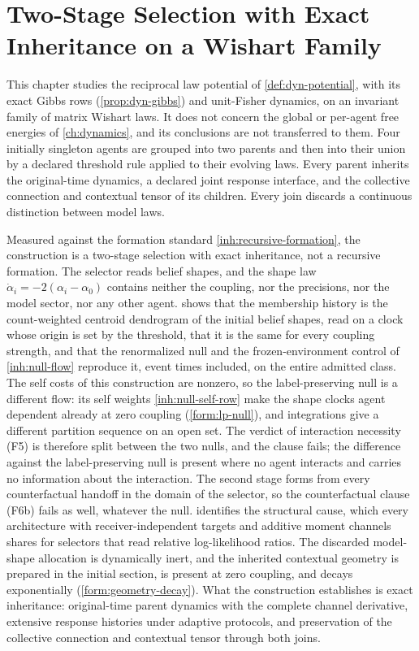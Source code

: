 \chapter{Two-Stage Selection with Exact Inheritance on a Wishart Family}
\label{ch:conditional-formation}

This chapter studies the reciprocal law potential of \cref{def:dyn-potential}, with its exact Gibbs rows (\cref{prop:dyn-gibbs}) and unit-Fisher dynamics, on an invariant family of matrix Wishart laws. It does not concern the global or per-agent free energies of \cref{ch:dynamics}, and its conclusions are not transferred to them. Four initially singleton agents are grouped into two parents and then into their union by a declared threshold rule applied to their evolving laws. Every parent inherits the original-time dynamics, a declared joint response interface, and the collective connection and contextual tensor of its children. Every join discards a continuous distinction between model laws.

Measured against the formation standard \cref{inh:recursive-formation}, the construction is a two-stage selection with exact inheritance, not a recursive formation. The selector reads belief shapes, and the shape law $\dot\alpha_i=-2(\alpha_i-\alpha_0)$ contains neither the coupling, nor the precisions, nor the model sector, nor any other agent.  shows that the membership history is the count-weighted centroid dendrogram of the initial belief shapes, read on a clock whose origin is set by the threshold, that it is the same for every coupling strength, and that the renormalized null and the frozen-environment control of \cref{inh:null-flow} reproduce it, event times included, on the entire admitted class. The self costs of this construction are nonzero, so the label-preserving null is a different flow: its self weights \cref{inh:null-self-row} make the shape clocks agent dependent already at zero coupling (\cref{form:lp-null}), and integrations give a different partition sequence on an open set. The verdict of interaction necessity (F5) is therefore split between the two nulls, and the clause fails; the difference against the label-preserving null is present where no agent interacts and carries no information about the interaction. The second stage forms from every counterfactual handoff in the domain of the selector, so the counterfactual clause (F6b) fails as well, whatever the null.  identifies the structural cause, which every architecture with receiver-independent targets and additive moment channels shares for selectors that read relative log-likelihood ratios. The discarded model-shape allocation is dynamically inert, and the inherited contextual geometry is prepared in the initial section, is present at zero coupling, and decays exponentially (\cref{form:geometry-decay}). What the construction establishes is exact inheritance: original-time parent dynamics with the complete channel derivative, extensive response histories under adaptive protocols, and preservation of the collective connection and contextual tensor through both joins.

